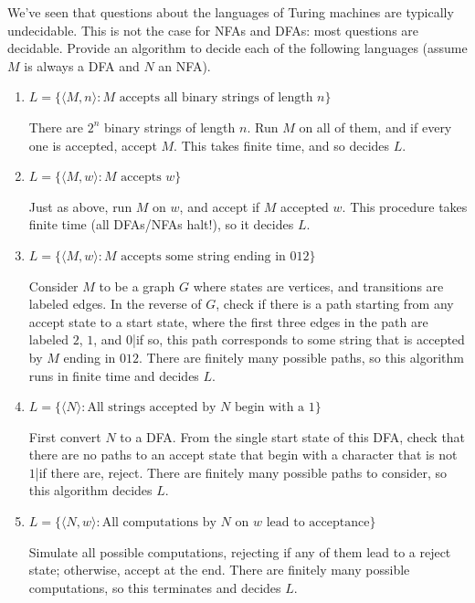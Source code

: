 \documentclass[fleqn]{article}
\begin{document}
\noindent We've seen that questions about the languages of Turing machines are typically undecidable. This is not the case for NFAs and DFAs: most questions are decidable. Provide an algorithm to decide each of the following languages (assume $M$ is always a DFA and $N$ an NFA).
\begin{enumerate}
    \item $L = \{\langle M, n \rangle : \text{$M$ accepts all binary strings of length $n$}\}$
    \begin{answer}
        There are $2^n$ binary strings of length $n$. Run $M$ on all of them, and if every one is accepted, accept $M$. This takes finite time, and so decides $L$.
    \end{answer}
    \item $L = \{\langle M, w \rangle : \text{$M$ accepts $w$}\}$
    \begin{answer}
        Just as above, run $M$ on $w$, and accept if $M$ accepted $w$. This procedure takes finite time (all DFAs/NFAs halt!), so it decides $L$.
    \end{answer}
    \item $L = \{\langle M, w \rangle : \text{$M$ accepts some string ending in $012$}\}$
    \begin{answer}
        Consider $M$ to be a graph $G$ where states are vertices, and transitions are labeled edges. In the reverse of $G$, check if there is a path starting from any accept state to a start state, where the first three edges in the path are labeled $2$, $1$, and $0$|if so, this path corresponds to some string that is accepted by $M$ ending in $012$. There are finitely many possible paths, so this algorithm runs in finite time and decides $L$.
    \end{answer}
    \item $L = \{\langle N \rangle : \text{All strings accepted by $N$ begin with a $1$}\}$
    \begin{answer}
        First convert $N$ to a DFA. From the single start state of this DFA, check that there are no paths to an accept state that begin with a character that is not $1$|if there are, reject. There are finitely many possible paths to consider, so this algorithm decides $L$.
    \end{answer}
    \item $L = \{\langle N, w \rangle : \text{All computations by $N$ on $w$ lead to acceptance}\}$
    \begin{answer}
        Simulate all possible computations, rejecting if any of them lead to a reject state; otherwise, accept at the end. There are finitely many possible computations, so this terminates and decides $L$.
    \end{answer}
\end{enumerate}
\end{document}
